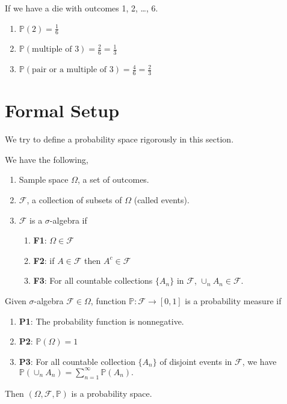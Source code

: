 \begin{eg}
If we have a die with outcomes 1, 2, \ldots, 6. 
\begin{enumerate}
    \item $\mathbb{P}(2) = \frac{1}{6}$
    \item $\mathbb{P}(\text{multiple of }3) = \frac{2}{6} = \frac{1}{3}$
    \item \(\mathbb{P}(\text{pair or a multiple of }3) = \frac{4}{6} = \frac{2}{3}\) 
\end{enumerate}
\end{eg}
\section{Formal Setup}
We try to define a probability space rigorously in this section.
\begin{definition}
    We have the following,
    \begin{enumerate}
        \item Sample space \(\Omega\), a set of outcomes.
        \item \(\mathcal{F}\), a collection of subsets of \(\Omega\) (called events).
        \item \(\mathcal{F}\) is a \(\sigma\)-algebra if
        \begin{enumerate}
            \item \textbf{F1}: \(\Omega\in\mathcal{F} \)
            \item \textbf{F2}: if \(A \in \mathcal{F} \) then \(A^c \in \mathcal{F} \)
            \item \textbf{F3}: For all countable collections \(\{A_n\}\) in \(\mathcal{F} \), \(\cup_n A_n \in \mathcal{F} \).
        \end{enumerate} 
    \end{enumerate}
    Given \(\sigma\)-algebra \(\mathcal{F} \in \Omega\), function $\mathbb{P}: \mathcal{F} \to [0,1]$ is a probability measure if
    \begin{enumerate}
        \item \textbf{P1}: The probability function is nonnegative.
        \item \textbf{P2}: \(\mathbb{P}(\Omega) = 1\) 
        \item \textbf{P3}: For all countable collection \(\{A_n\}\) of disjoint events in \(\mathcal{F} \), we have
        \(
            \mathbb{P}(\cup_n A_n) = \sum\limits_{n=1}^{\infty} \mathbb{P}(A_n).
        \)
    \end{enumerate}
    Then \((\Omega, \mathcal{F}, \mathbb{P})\) is a probability space. 
\end{definition}

